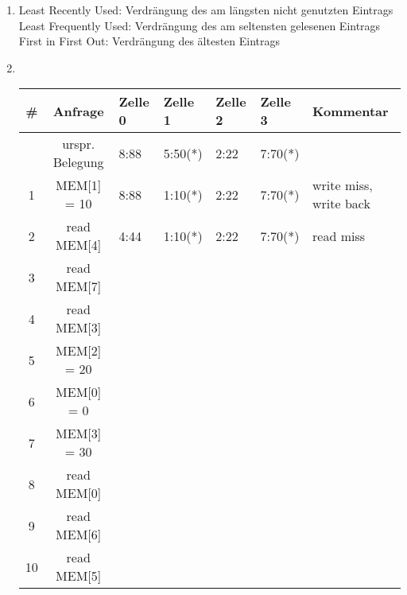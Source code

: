 \documentclass[10pt,a4paper,landscape]{article}
\begin{document}
\begin{enumerate}
		\item Least Recently Used: Verdrängung des am längsten nicht genutzten Eintrags \\
					Least Frequently Used: Verdrängung des am seltensten gelesenen Eintrags \\
					First in First Out: Verdrängung des ältesten Eintrags
		\item \text{}\\
			\begin{tabular}{cc|lllll}
				\# & Anfrage         & Zelle 0 & Zelle 1 & Zelle 2 & Zelle 3 & Kommentar              \\ \hline
				   & urspr. Belegung & 8:88    & 5:50(*) & 2:22    & 7:70(*) &                        \\
				 1 & MEM[1] = 10     & 8:88    & 1:10(*) & 2:22    & 7:70(*) & write miss, write back \\
				 2 & read MEM[4]     & 4:44    & 1:10(*) & 2:22    & 7:70(*) & read miss              \\
				 3 & read MEM[7]     &         &         &         &         &                        \\ 
				 4 & read MEM[3]     &         &         &         &         &                        \\ 
				 5 & MEM[2] = 20     &         &         &         &         &                        \\
				 6 & MEM[0] = 0      &         &         &         &         &                        \\ 
				 7 & MEM[3] = 30     &         &         &         &         &                        \\ 
				 8 & read MEM[0]     &         &         &         &         &                        \\ 
				 9 & read MEM[6]     &         &         &         &         &                        \\ 
				10 & read MEM[5]     &         &         &         &         &                        \\ 
			\end{tabular}
	\end{enumerate}
			
\end{document}
